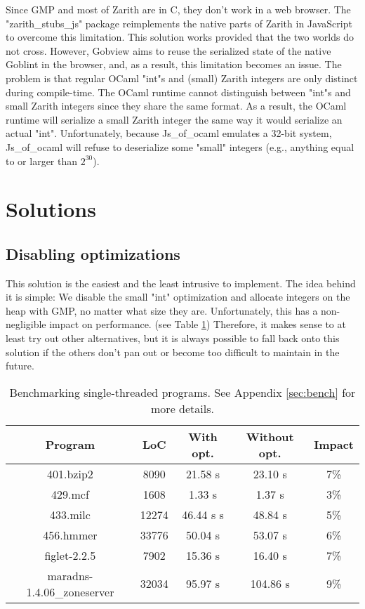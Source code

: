 \documentclass{scrartcl}
\begin{document}
Since GMP and most of Zarith are in C, they don't work in a web browser. The "zarith\_stubs\_js" package reimplements the native parts of Zarith in JavaScript to overcome this limitation. This solution works provided that the two worlds do not cross. However, Gobview aims to reuse the serialized state of the native Goblint in the browser, and, as a result, this limitation becomes an issue. The problem is that regular OCaml "int"s and (small) Zarith integers are only distinct during compile-time. The OCaml runtime cannot distinguish between "int"s and small Zarith integers since they share the same format. As a result, the OCaml runtime will serialize a small Zarith integer the same way it would serialize an actual "int". Unfortunately, because Js\_of\_ocaml emulates a 32-bit system, Js\_of\_ocaml will refuse to deserialize some "small" integers (e.g., anything equal to or larger than $2^{30}$).

\section{Solutions}

\subsection{Disabling optimizations}

This solution is the easiest and the least intrusive to implement. The idea behind it is simple: We disable the small "int" optimization and allocate integers on the heap with GMP, no matter what size they are. Unfortunately, this has a non-negligible impact on performance. (see Table \ref{tab:bench}) Therefore, it makes sense to at least try out other alternatives, but it is always possible to fall back onto this solution if the others don't pan out or become too difficult to maintain in the future.

\begin{table}[h!]
    \centering
    \begin{tabular}{cc|cc|c}
        \hline
        Program & LoC & With opt. & Without opt. & Impact \\
        \hline
        401.bzip2 & 8090 & 21.58 s & 23.10 s & 7\% \\
        429.mcf & 1608 & 1.33 s & 1.37 s & 3\% \\
        433.milc & 12274 & 46.44 s s & 48.84 s & 5\% \\
        456.hmmer & 33776 & 50.04 s & 53.07 s & 6\% \\
        figlet-2.2.5 & 7902 & 15.36 s & 16.40 s & 7\% \\
        maradns-1.4.06\_zoneserver & 32034 & 95.97 s & 104.86 s & 9\% \\
        \hline
    \end{tabular}
    \caption{Benchmarking single-threaded programs. See Appendix \ref{sec:bench} for more details.}
    \label{tab:bench}
\end{table}
\end{document}

